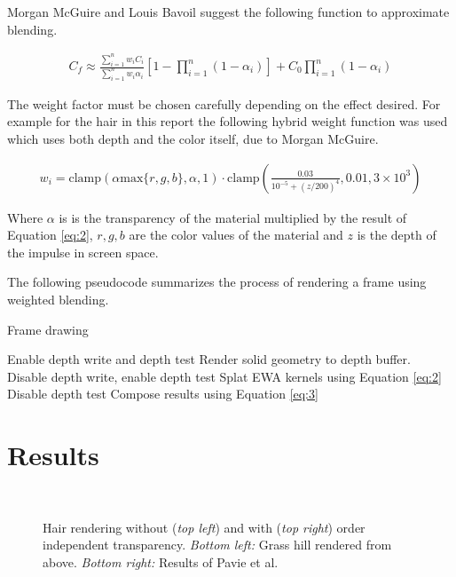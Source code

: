 \documentclass{article}
\begin{document}
Morgan McGuire and Louis Bavoil suggest the following function to approximate blending.\cite{McGuire2013Transparency}

\begin{align} \label{eq:wblend}
C_f \approx \frac{\sum\limits^n_{i=1} w_iC_i}{\sum\limits^n_{i=1} w_i\alpha_i}
    \left[ 1-\prod_{i=1}^n{(1-\alpha_i)} \right] + C_0\prod_{i=1}^n{(1-\alpha_i)}
\end{align}

The weight factor must be chosen carefully depending on the effect desired. For example for the hair in this report the following hybrid weight function was used which uses both depth and the color itself, due to Morgan McGuire.\cite{mcguire_2014}

\begin{align} \label{eq:3}
w_i = \text{clamp}(\alpha\text{max}\{r, g, b\}, \alpha, 1) \cdot
    \text{clamp}\left(\frac{0.03}{10^{-5} + (z / 200)^4}, 0.01, 3\times10^3\right)
\end{align}

Where $\alpha$ is is the transparency of the material multiplied by the result of Equation \ref{eq:2}, $r,g,b$ are the color values of the material and $z$ is the depth of the impulse in screen space.

The following pseudocode summarizes the process of rendering a frame using weighted blending. 

\begin{algorithm}
\caption{Frame drawing} \label{alg:wblend}
\begin{algorithmic}
\State Enable depth write and depth test
\State Render solid geometry to depth buffer.
\State Disable depth write, enable depth test 
\State Splat EWA kernels using Equation \ref{eq:2}
\State Disable depth test
\State Compose results using Equation \ref{eq:3}
\end{algorithmic}
\end{algorithm}

\section{Results}

\begin{figure*}
    \vspace{-1cm}
     \\
    \caption{Hair rendering without (\textit{top left}) and with (\textit{top right}) order independent transparency. \textit{Bottom left: } Grass hill rendered from above. \textit{Bottom right:} Results of Pavie et al.}
    \label{fig:strand}
    \end{figure*}
\end{document}

